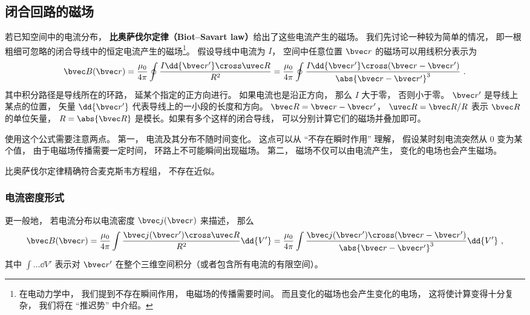 
\subsection{闭合回路的磁场}
若已知空间中的电流分布， \textbf{比奥萨伐尔定律（Biot–Savart law）}给出了这些电流产生的磁场。 我们先讨论一种较为简单的情况， 即一根粗细可忽略的闭合导线中的恒定电流产生的磁场\footnote{在电动力学中， 我们提到不存在瞬间作用， 电磁场的传播需要时间。 而且变化的磁场也会产生变化的电场， 这将使计算变得十分复杂， 我们将在 “推迟势” 中介绍。}。 假设导线中电流为 $I$， 空间中任意位置 $\bvec r$ 的磁场可以用线积分表示为
\begin{equation}\label{eq_BioSav_2}
\bvec B(\bvec r) = \frac{\mu_0}{4\pi} \oint \frac{I \dd{\bvec r'} \cross \uvec R}{R^2}
= \frac{\mu_0}{4\pi} \oint \frac{I \dd{\bvec r'} \cross (\bvec r - \bvec r')}{\abs{\bvec r - \bvec r'}^3}~.
\end{equation}
其中积分路径是导线所在的环路， 延某个指定的正方向进行。 如果电流也是沿正方向， 那么 $I$ 大于零， 否则小于零。 $\bvec r'$ 是导线上某点的位置， 矢量 $\dd{\bvec r'}$ 代表导线上的一小段的长度和方向。 $\bvec R = \bvec r - \bvec r'$， $\uvec R = \bvec R/R$ 表示 $\bvec R$ 的单位矢量， $R = \abs{\bvec R}$ 是模长。如果有多个这样的闭合导线， 可以分别计算它们的磁场并叠加即可。

使用这个公式需要注意两点。 第一， 电流及其分布不随时间变化。 这点可以从 “不存在瞬时作用” 理解， 假设某时刻电流突然从 0 变为某个值， 由于电磁场传播需要一定时间， 环路上不可能瞬间出现磁场。 第二， 磁场不仅可以由电流产生， 变化的电场也会产生磁场。%

比奥萨伐尔定律精确符合麦克斯韦方程组， 不存在近似。

\subsubsection{电流密度形式}
更一般地， 若电流分布以电流密度 $\bvec j(\bvec r)$ 来描述， 那么
\begin{equation}\label{eq_BioSav_3}
\bvec B(\bvec r) = \frac{\mu_0}{4\pi} \int \frac{\bvec j(\bvec r') \cross \uvec R}{R^2} \dd{V'} = \frac{\mu_0}{4\pi} \int \frac{\bvec j(\bvec r') \cross (\bvec r - \bvec r')}{\abs{\bvec r - \bvec r'}^3} \dd{V'}~,
\end{equation}
其中 $\int \dots \dd{V'}$ 表示对 $\bvec r'$ 在整个三维空间积分（或者包含所有电流的有限空间）。

